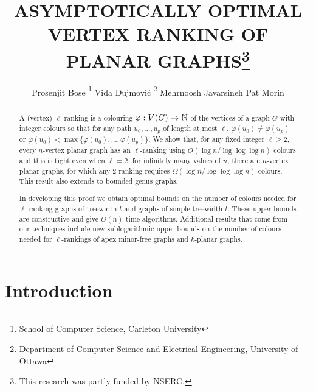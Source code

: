 \documentclass[kpfonts]{patmorin}
\title{\MakeUppercase{Asymptotically Optimal Vertex Ranking of Planar Graphs}\thanks{This research was partly funded by NSERC.}}
\author{Prosenjit Bose%
    \thanks{School of Computer Science, Carleton University}\quad
    Vida Dujmović%
    \thanks{Department of Computer Science and Electrical Engineering, University of Ottawa}\quad
    Mehrnoosh Javarsineh\footnotemark[2]  \quad
    Pat Morin\footnotemark[2]}
\newcommand{\defin}[1]{\emph{\color{brightmaroon}#1}}
\theoremstyle{named}
\begin{document}
\begin{titlepage}
\maketitle

\begin{abstract}
  A (vertex) $\ell$-ranking is a colouring $\varphi:V(G)\to\mathbb{N}$ of the vertices of a graph $G$ with integer colours so that for any path $u_0,\ldots,u_p$ of length at most $\ell$, $\varphi(u_0)\neq\varphi(u_p)$ or $\varphi(u_0)<\max\{\varphi(u_0),\ldots,\varphi(u_p)\}$.  We show that, for any fixed integer $\ell\ge 2$, every $n$-vertex planar graph has an $\ell$-ranking using $O(\log n/\log\log\log n)$ colours and this is tight even when $\ell=2$; for infinitely many values of $n$, there are $n$-vertex planar graphs, for which any 2-ranking requires $\Omega(\log n/\log\log\log n)$ colours.  This result also extends to bounded genus graphs.

  In developing this proof we obtain optimal bounds on the number of colours needed for $\ell$-ranking graphs of treewidth $t$ and graphs of simple treewidth $t$.  These upper bounds are constructive and give $O(n)$-time algorithms.  Additional results that come from our techniques include new sublogarithmic upper bounds on the number of colours needed for $\ell$-rankings of apex minor-free graphs and $k$-planar graphs.
\end{abstract}
\end{titlepage}

%
{}

\section{Introduction}

\end{document}
